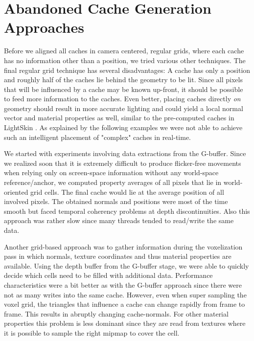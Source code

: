 \documentclass[thesis.tex]{subfiles}
\begin{document}
\section{Abandoned Cache Generation Approaches} \label{chap:abandoned}


Before we aligned all caches in camera centered, regular grids, where each cache has no information other than a position, we tried various other techniques. %
The final regular grid technique has several disadvantages:
A cache has only a position and roughly half of the caches lie behind the geometry to be lit.
Since all pixels that will be influenced by a cache may be known up-front, it should be possible to feed more information to the caches.
Even better, placing caches directly \emph{on} geometry should result in more accurate lighting and could yield a local normal vector and material properties as well, similar to the pre-computed caches in LightSkin \cite{bib:LightskinPaper}.
As explained by the following examples we were not able to achieve such an intelligent placement of "complex" caches in real-time.

We started with experiments involving data extractions from the G-buffer.
Since we realized soon that it is extremely difficult to produce flicker-free movements when relying only on screen-space information without any world-space reference/anchor, we computed property averages of all pixels that lie in world-oriented grid cells.
The final cache would lie at the average position of all involved pixels.
The obtained normals and positions were most of the time smooth but faced temporal coherency problems at depth discontinuities.
Also this approach was rather slow since many threads tended to read/write the same data.

Another grid-based approach was to gather information during the voxelization pass in which normals, texture coordinates and thus material properties are available.
Using the depth buffer from the G-buffer stage, we were able to quickly decide which cells need to be filled with additional data.
Performance characteristics were a bit better as with the G-buffer approach since there were not as many writes into the same cache.
However, even when super sampling the voxel grid, the triangles that influence a cache can change rapidly from frame to frame.
This results in abruptly changing cache-normals.
For other material properties this problem is less dominant since they are read from textures where it is possible to sample the right mipmap to cover the cell.
\end{document}
